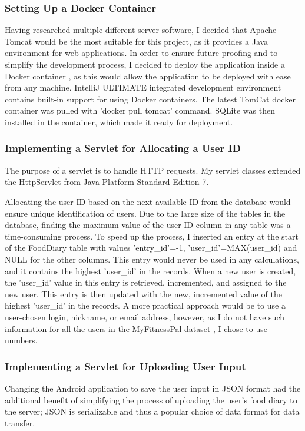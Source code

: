 \documentclass{article}
\begin{document}
\subsubsection{Setting Up a Docker Container}
Having researched multiple different server software, I decided that Apache Tomcat \cite{apache_tomcat} would be the most suitable for this project, as it provides a Java environment for web applications. In order to ensure future-proofing and to simplify the development process, I decided to deploy the application inside a Docker container \cite{docker}, as this would allow the application to be deployed with ease from any machine. IntelliJ ULTIMATE integrated development environment \cite{intellij} contains built-in support for using Docker containers. The latest TomCat docker container was pulled with 'docker pull tomcat' command. SQLite was then installed in the container, which made it ready for deployment.

\subsubsection{Implementing a Servlet for Allocating a User ID}
The purpose of a servlet is to handle HTTP requests. My servlet classes extended the HttpServlet from Java Platform Standard Edition 7. 

\bigskip
\noindent Allocating the user ID based on the next available ID from the database would ensure unique identification of users. Due to the large size of the tables in the database, finding the maximum value of the user ID column in any table was a time-consuming process. To speed up the process, I inserted an entry at the start of the FoodDiary table with values 'entry\_id'=-1, 'user\_id'=MAX(user\_id) and NULL for the other columns. This entry would never be used in any calculations, and it contains the highest 'user\_id' in the records. When a new user is created, the 'user\_id' value in this entry is retrieved, incremented, and assigned to the new user. This entry is then updated with the new, incremented value of the highest 'user\_id' in the records. A more practical approach would be to use a user-chosen login, nickname, or email address, however, as I do not have such information for all the users in the MyFitnessPal dataset \cite{diet_success_predictions}, I chose to use numbers. 

\subsubsection{Implementing a Servlet for Uploading User Input}
Changing the Android application to save the user input in JSON format had the additional benefit of simplifying the process of uploading the user's food diary to the server; JSON is serializable and thus a popular choice of data format for data transfer. 
\end{document}
